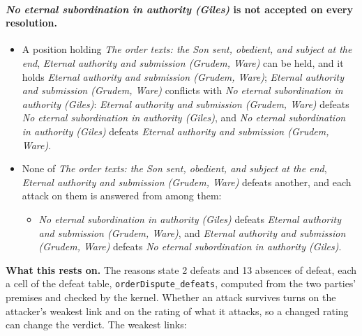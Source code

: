 \documentclass[11pt,paper=\testimonypaper,DIV=13,parskip=false]{scrartcl}
\begin{document}
\paragraph{\emph{No eternal subordination in authority (Giles)} is not accepted on every resolution.}
\begin{itemize}
\item A position holding \emph{The order texts: the Son sent, obedient, and subject at the end}, \emph{Eternal authority and submission (Grudem, Ware)} can be held, and it holds \emph{Eternal authority and submission (Grudem, Ware)}; \emph{Eternal authority and submission (Grudem, Ware)} conflicts with \emph{No eternal subordination in authority (Giles)}: \emph{Eternal authority and submission (Grudem, Ware)} defeats \emph{No eternal subordination in authority (Giles)}, and \emph{No eternal subordination in authority (Giles)} defeats \emph{Eternal authority and submission (Grudem, Ware)}.
\item None of \emph{The order texts: the Son sent, obedient, and subject at the end}, \emph{Eternal authority and submission (Grudem, Ware)} defeats another, and each attack on them is answered from among them:
\begin{itemize}
\item \emph{No eternal subordination in authority (Giles)} defeats \emph{Eternal authority and submission (Grudem, Ware)}, and \emph{Eternal authority and submission (Grudem, Ware)} defeats \emph{No eternal subordination in authority (Giles)}.
\end{itemize}
\end{itemize}
\par\noindent\textbf{What this rests on.} The reasons state 2 defeats and 13 absences of defeat, each a cell of the defeat table, \texttt{order\allowbreak{}Dispute\_\allowbreak{}defeats}, computed from the two parties' premises and checked by the kernel. Whether an attack survives turns on the attacker's weakest link and on the rating of what it attacks, so a changed rating can change the verdict. The weakest links:
\end{document}
